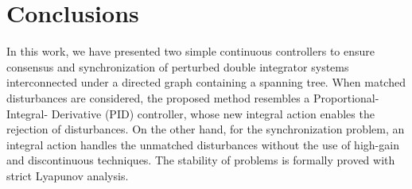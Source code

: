 \documentclass[journal,twoside]{IEEEtran}
\begin{document}
\section{Conclusions}
In this work, we have presented two simple continuous controllers to ensure consensus and synchronization of perturbed double integrator systems interconnected under a directed graph containing a spanning tree. 
When matched disturbances are considered, the proposed method resembles a Proportional-Integral- Derivative (PID) controller, whose new integral action enables the rejection of disturbances. On the other hand, for the synchronization problem, an integral action handles the unmatched disturbances without the use of high-gain and discontinuous techniques. The stability of problems is formally proved with strict Lyapunov analysis. 
 
\end{document}
